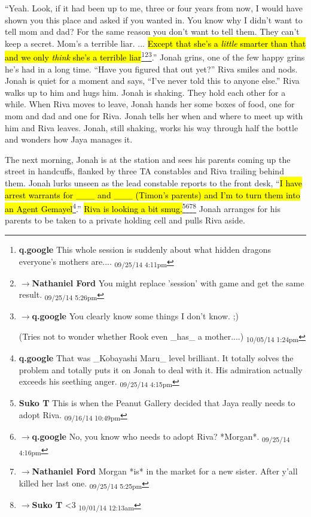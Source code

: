 ``Yeah.  Look, if it had been up to me, three or four years from now, I would have shown you this place and asked if you wanted in.  You know why I didn't want to tell mom and dad?  For the same reason you don't want to tell them.  They can't keep a secret.  Mom's a terrible liar. ... \hl{Except that she's a \textit{little} smarter than that and we only \textit{think} she's a terrible liar}\footnote{\textbf{q.google }This whole session is suddenly about what hidden dragons everyone's mothers are.... \textsubscript{09/25/14 4:11pm}}\footnote{$\rightarrow$\textbf{Nathaniel Ford }You might replace 'session' with game and get the same result. \textsubscript{09/25/14 5:26pm}}\footnote{$\rightarrow$\textbf{q.google }You clearly know some things I don't know. ;)

(Tries not to wonder whether Rook even \_has\_ a mother....) \textsubscript{10/05/14 1:24pm}}.''  Jonah grins, one of the few happy grins he's had in a long time.  ``Have you figured that out yet?''  Riva smiles and nods.  Jonah is quiet for a moment and says, ``I've never told this to anyone else.'' Riva walks up to him and hugs him.  Jonah is shaking.  They hold each other for a while.  When Riva moves to leave, Jonah hands her some boxes of food, one for mom and dad and one for Riva.  Jonah tells her when and where to meet up with him and Riva leaves.  Jonah, still shaking, works his way through half the bottle and wonders how Jaya manages it.



The next morning, Jonah is at the station and sees his parents coming up the street in handcuffs, flanked by three TA constables and Riva trailing behind them.  Jonah lurks unseen as the lead constable reports to the front desk, ``\hl{I have arrest warrants for \_\_\_ and \_\_\_ (Timon's parents) and I'm to turn them into an Agent Gemayel}\footnote{\textbf{q.google }That was \_Kobayashi Maru\_ level brilliant.  It totally solves the problem and totally puts it on Jonah to deal with it.  His admiration actually exceeds his seething anger. \textsubscript{09/25/14 4:15pm}}.''  \hl{Riva is looking a bit smug.}\footnote{\textbf{Suko T }This is when the Peanut Gallery decided that Jaya really needs to adopt Riva. \textsubscript{09/16/14 10:49pm}}\footnote{$\rightarrow$\textbf{q.google }No, you know who needs to adopt Riva?  *Morgan*. \textsubscript{09/25/14 4:16pm}}\footnote{$\rightarrow$\textbf{Nathaniel Ford }Morgan *is* in the market for a new sister. After y'all killed her last one. \textsubscript{09/25/14 5:25pm}}\footnote{$\rightarrow$\textbf{Suko T }\textless 3 \textsubscript{10/01/14 12:13am}}  Jonah arranges for his parents to be taken to a private holding cell and pulls Riva aside.

